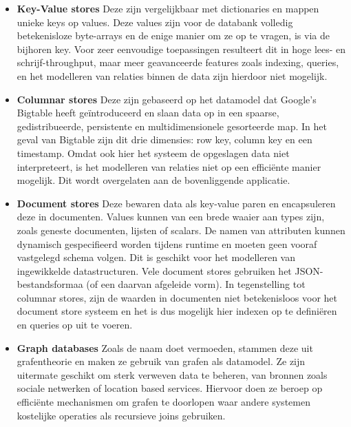 \begin{itemize}
\item \textbf{Key-Value stores} Deze zijn vergelijkbaar met dictionaries en mappen unieke keys op values. Deze values zijn voor de databank volledig betekenisloze byte-arrays en de enige manier om ze op te vragen, is via de bijhoren key. Voor zeer eenvoudige toepassingen resulteert dit in hoge lees- en schrijf-throughput, maar meer geavanceerde features zoals indexing, queries, en het modelleren van relaties binnen de data zijn hierdoor niet mogelijk\cite{hecht2011nosql}\cite{grolinger2013data}.

\item \textbf{Columnar stores} Deze zijn gebaseerd op het datamodel dat Google's Bigtable heeft ge\"introduceerd en slaan data op in een spaarse, gedistribueerde, persistente en multidimensionele gesorteerde map\cite{chang2008bigtable}. In het geval van Bigtable zijn dit drie dimensies: row key, column key en een timestamp. Omdat ook hier het systeem de opgeslagen data niet interpreteert, is het modelleren van relaties niet op een effici\"ente manier mogelijk. Dit wordt overgelaten aan de bovenliggende applicatie\cite{hecht2011nosql}.

\item \textbf{Document stores} Deze bewaren data als key-value paren en encapsuleren deze in documenten. Values kunnen van een brede waaier aan types zijn, zoals geneste documenten, lijsten of scalars. De namen van attributen kunnen dynamisch gespecifieerd worden tijdens runtime en moeten geen vooraf vastgelegd schema volgen\cite{cattell2011scalable}. Dit is geschikt voor het modelleren van ingewikkelde datastructuren. Vele document stores gebruiken het JSON-bestandsformaa (of een daarvan afgeleide vorm). In tegenstelling tot columnar stores, zijn de waarden in documenten niet betekenisloos voor het document store systeem en het is dus mogelijk hier indexen op te defini\"eren en queries op uit te voeren\cite{hecht2011nosql}.

\item \textbf{Graph databases} Zoals de naam doet vermoeden, stammen deze uit grafentheorie en maken ze gebruik van grafen als datamodel. Ze zijn uitermate geschikt om sterk verweven data te beheren, van bronnen zoals sociale netwerken of location based services. Hiervoor doen ze beroep op effici\"ente mechanismen om grafen te doorlopen waar andere systemen kostelijke operaties als recursieve joins gebruiken\cite{hecht2011nosql}.

\end{itemize}

